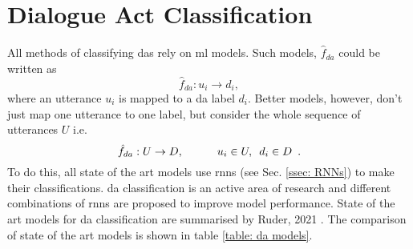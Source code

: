
\section{Dialogue Act Classification \label{ssec: da classification}}
    All methods of classifying \glspl{da} rely on \gls{ml} \glspl{model}. Such \glspl{model}, $\hat{f}_{da}$ could be written as
    \begin{equation}
        \hat{f}_{da}: u_i \rightarrow d_i,
    \end{equation}
    where an \gls{utterance} $u_i$ is mapped to a \gls{da} label $d_i$. Better \glspl{model}, however, don't just map one \gls{utterance} to one label, but consider the whole sequence of \glspl{utterance} $U$ i.e.
    \begin{equation}
        \hat{f}_{da}: U \rightarrow D, \hspace{3em} u_i \in U, \hspace{0.5em} d_i \in D \hspace{0.5em}.
    \end{equation}
    To do this, all state of the art \glspl{model} use \glspl{rnn} (see Sec. \ref{ssec: RNNs}) to make their classifications. \Gls{da} classification is an active area of research and different combinations of \glspl{rnn} are proposed to improve \gls{model} performance. State of the art \glspl{model} for \gls{da} classification are summarised by Ruder, 2021 \cite{DAgithub}. The comparison of state of the art \glspl{model} is shown in table \ref{table: da models}.

